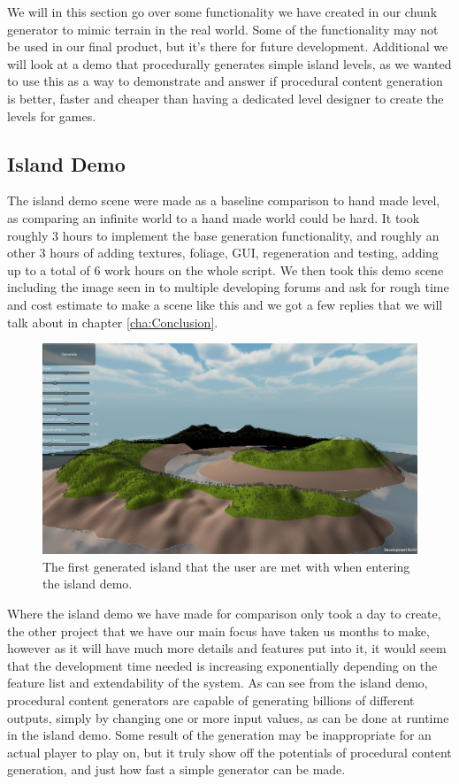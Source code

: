 We will in this section go over some functionality we have created in our chunk generator to mimic terrain in the real world. Some of the functionality may not be used in our final product, but it's there for future development. Additional we will look at a demo that procedurally generates simple island levels, as we wanted to use this as a way to demonstrate and answer if procedural content generation is better, faster and cheaper than having a dedicated level designer to create the levels for games.


\subsection{Island Demo}

The island demo scene were made as a baseline comparison to hand made level, as comparing an infinite world to a hand made world could be hard. It took roughly 3 hours to implement the base generation functionality, and roughly an other 3 hours of adding textures, foliage, GUI, regeneration and testing, adding up to a total of 6 work hours on the whole script. We then took this demo scene including the image seen in  to multiple developing forums and ask for rough time and cost estimate to make a scene like this and we got a few replies that we will talk about in chapter \ref{cha:Conclusion}.

\begin{figure}[H]
	\includegraphics[width=1\linewidth]{img/IslandDemo}
	\centering
	\caption{The first generated island that the user are met with when entering the island demo.}
	\label{fig:IslandDemo}
\end{figure}

Where the island demo we have made for comparison only took a day to create, the other project that we have our main focus have taken us months to make, however as it will have much more details and features put into it, it would seem that the development time needed is increasing exponentially depending on the feature list and extendability of the system. As can see from the island demo, procedural content generators are capable of generating billions of different outputs, simply by changing one or more input values, as can be done at runtime in the island demo. Some result of the generation may be inappropriate for an actual player to play on, but it truly show off the potentials of procedural content generation, and just how fast a simple generator can be made.


